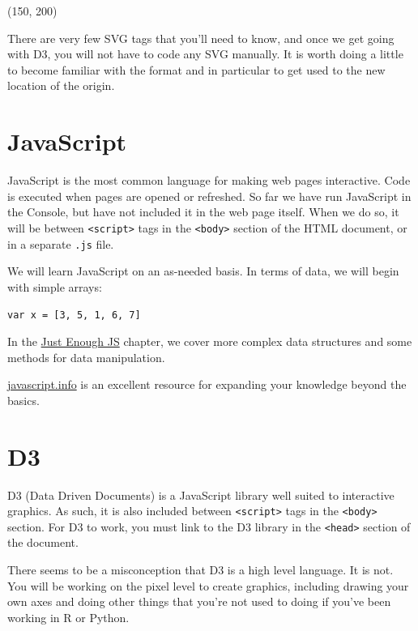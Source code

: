 \documentclass[
  openany]{book}
\begin{document}
(150, 200)

There are very few SVG tags that you'll need to know, and once we get going with D3, you will not have to code any SVG manually. It is worth doing a little to become familiar with the format and in particular to get used to the new location of the origin.

\hypertarget{javascript}{%
\section{\texorpdfstring{JavaScript }{JavaScript }}\label{javascript}}

JavaScript is the most common language for making web pages interactive. Code is executed when pages are opened or refreshed. So far we have run JavaScript in the Console, but have not included it in the web page itself. When we do so, it will be between \texttt{\textless{}script\textgreater{}} tags in the \texttt{\textless{}body\textgreater{}} section of the HTML document, or in a separate \texttt{.js} file.

We will learn JavaScript on an as-needed basis. In terms of data, we will begin with simple arrays:

\texttt{var\ x\ =\ {[}3,\ 5,\ 1,\ 6,\ 7{]}}

In the \href{just-enough-js.html}{Just Enough JS} chapter, we cover more complex data structures and some methods for data manipulation.

\href{https://javascript.info}{javascript.info} is an excellent resource for expanding your knowledge beyond the basics.

\hypertarget{d3}{%
\section{\texorpdfstring{D3 }{D3 }}\label{d3}}

D3 (Data Driven Documents) is a JavaScript library well suited to interactive graphics. As such, it is also included between \texttt{\textless{}script\textgreater{}} tags in the \texttt{\textless{}body\textgreater{}} section. For D3 to work, you must link to the D3 library in the \texttt{\textless{}head\textgreater{}} section of the document.

There seems to be a misconception that D3 is a high level language. It is not. You will be working on the pixel level to create graphics, including drawing your own axes and doing other things that you're not used to doing if you've been working in R or Python.
\end{document}
